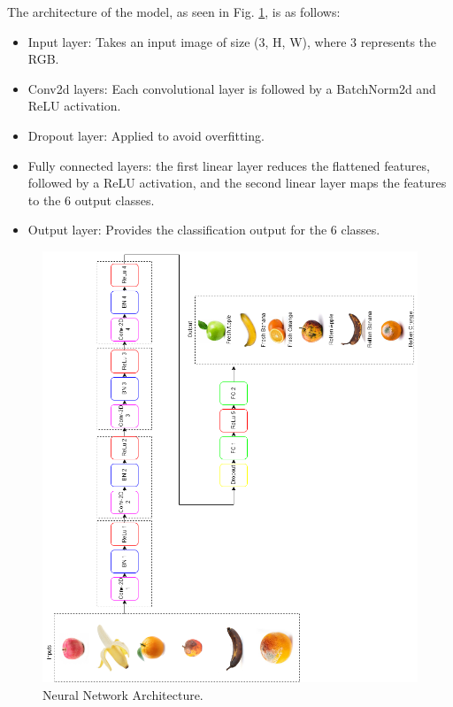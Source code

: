 \documentclass[conference]{IEEEtran}
\begin{document}
The architecture of the model, as seen in Fig. \ref{fig2}, is as follows:
\begin{itemize}
    \item Input layer: Takes an input image of size (3, H, W), where 3 represents the RGB.
    \item Conv2d layers: Each convolutional layer is followed by a BatchNorm2d and ReLU activation.
    \item Dropout layer: Applied to avoid overfitting.
    \item Fully connected layers: the first linear layer reduces the flattened features, followed by a ReLU activation, and the second linear layer maps the features to the 6 output classes.
    \item Output layer: Provides the classification output for the 6 classes.
\end{itemize}

\begin{figure}[h]
    \centering
    \includegraphics[width=\linewidth]{Ai Prent.drawio (1).png}
    \caption{Neural Network Architecture.}
    \label{fig2}
\end{figure}
\end{document}
